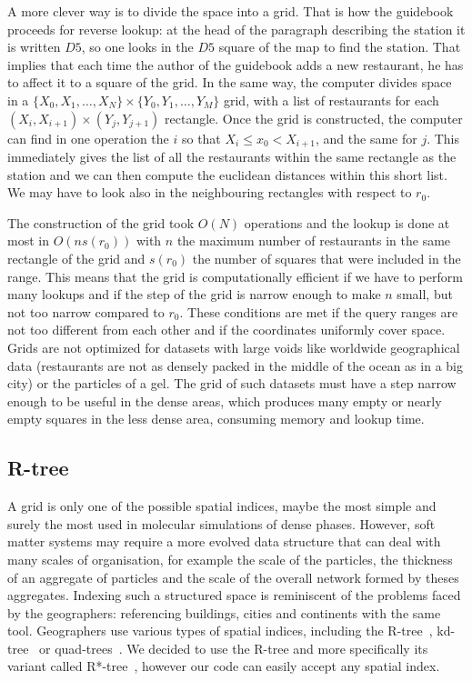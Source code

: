 A more clever way is to divide the space into a grid. That is how the guidebook proceeds for reverse lookup: at the head of the paragraph describing the station it is written $D5$, so one looks in the $D5$ square of the map to find the station. That implies that each time the author of the guidebook adds a new restaurant, he has to affect it to a square of the grid. In the same way, the computer divides space in a $\{X_0, X_1, \ldots, X_N\}\times\{Y_0, Y_1, \ldots, Y_M\}$ grid, with a list of restaurants for each $(X_i, X_{i+1}) \times (Y_j, Y_{j+1})$ rectangle. Once the grid is constructed, the computer can find in one operation the $i$ so that $X_i \leq x_0 < X_{i+1}$, and the same for $j$. This immediately gives the list of all the restaurants within the same rectangle as the station and we can then compute the euclidean distances within this short list. We may have to look also in the neighbouring rectangles with respect to $r_0$.

The construction of the grid took $O(N)$ operations and the lookup is done at most in $O(n s(r_0))$ with $n$ the maximum number of restaurants in the same rectangle of the grid and $s(r_0)$ the number of squares that were included in the range. This means that the grid is computationally efficient if we have to perform many lookups and if the step of the grid is narrow enough to make $n$ small, but not too narrow compared to $r_0$. These conditions are met if the query ranges are not too different from each other and if the coordinates uniformly cover space. Grids are not optimized for datasets with large voids like worldwide geographical data (restaurants are not as densely packed in the middle of the ocean as in a big city) or the particles of a gel. The grid of such datasets must have a step narrow enough to be useful in the dense areas, which produces many empty or nearly empty squares in the less dense area, consuming memory and lookup time.

\subsection{R-tree}

A grid is only one of the possible spatial indices, maybe the most simple and surely the most used in molecular simulations of dense phases. However, soft matter systems may require a more evolved data structure that can deal with many scales of organisation, for example the scale of the particles, the thickness of an aggregate of particles and the scale of the overall network formed by theses aggregates. Indexing such a structured space is reminiscent of the problems faced by the geographers: referencing buildings, cities and continents with the same tool. Geographers use various types of spatial indices, including the R-tree~\citep{Guttman1984}, kd-tree~\citep{Bentley1975} or quad-trees~\citep{Finkel1974}. We decided to use the R-tree and more specifically its variant called R*-tree~\citep{Beckmann1990}, however our code can easily accept any spatial index.

